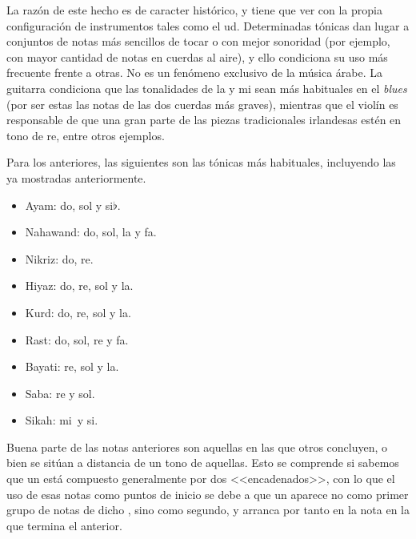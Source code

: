 La razón de este hecho es de caracter histórico, y tiene que ver con la propia configuración de instrumentos tales como el ud. Determinadas tónicas dan lugar a conjuntos de notas más sencillos de tocar o con mejor sonoridad (por ejemplo, con mayor cantidad de notas en cuerdas al aire), y ello condiciona su uso más frecuente frente a otras. No es un fenómeno exclusivo de la música árabe. La guitarra condiciona que las tonalidades de la y mi sean más habituales en el \emph{blues} (por ser estas las notas de las dos cuerdas más graves), mientras que el violín es responsable de que una gran parte de las piezas tradicionales irlandesas estén en tono de re, entre otros ejemplos.

Para los \ashnas anteriores, las siguientes son las tónicas más habituales, incluyendo las ya mostradas anteriormente.

\begin{center}
\begin{minipage}{.4\textwidth}
\begin{itemize}
\item Ayam: do, sol y si$\flat$.
\item Nahawand: do, sol, la y fa.
\item Nikriz: do, re.
\item Hiyaz: do, re, sol y la.
\item Kurd: do, re, sol y la.
\end{itemize}
\end{minipage}
\hfill
\begin{minipage}{.4\textwidth}
\begin{itemize}
\item Rast: do, sol, re y fa.
\item Bayati: re, sol y la.
\item Saba: re y sol.
\item Sikah: mi\hflat\ y si\hflat.
\end{itemize}
\end{minipage}
\end{center}

Buena parte de las notas anteriores son aquellas en las que otros \ashnas concluyen, o bien se sitúan a distancia de un tono de aquellas. Esto se comprende si sabemos que un \maqam está compuesto generalmente por dos \ashnas <<encadenados>>, con lo que el uso de esas notas como puntos de inicio se debe a que un \yins aparece no como primer grupo de notas de dicho \maqamb, sino como segundo, y arranca por tanto en la nota en la que termina el anterior.

